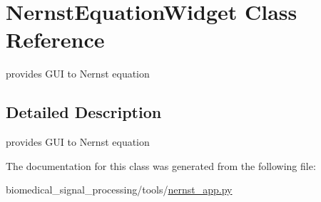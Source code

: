 \hypertarget{classNernstEquationWidget}{}\section{Nernst\+Equation\+Widget Class Reference}
\label{classNernstEquationWidget}


provides G\+UI to Nernst equation  




\subsection{Detailed Description}
provides G\+UI to Nernst equation 

The documentation for this class was generated from the following file\+:\begin{DoxyCompactItemize}
\item 
biomedical\+\_\+signal\+\_\+processing/tools/\hyperlink{nernst__app_8py}{nernst\+\_\+app.\+py}\end{DoxyCompactItemize}

